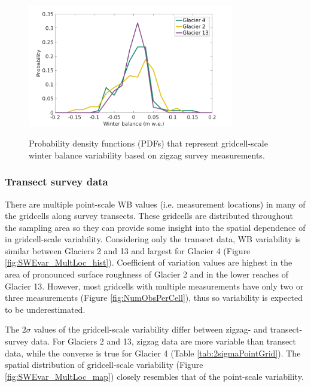\documentclass{sfuthesis}
\begin{document}
\begin{figure}[H]
	\centering
	\includegraphics[width =0.8\textwidth]{ZigzagPDF_G.png}\\
	\caption{Probability density functions (PDFs) that represent gridcell-scale winter balance variability based on zigzag survey measurements.}
	\label{fig:SWEvar_ZZG_hist}
\end{figure}

\subsubsection{Transect survey data}
There are multiple point-scale WB values (i.e. measurement locations) in many of the gridcells along survey transects. These gridcells are distributed throughout the sampling area so they can provide some insight into the spatial dependence of in gridcell-scale variability. Considering only the transect data, WB variability is similar between Glaciers 2 and 13 and largest for Glacier 4 (Figure \ref{fig:SWEvar_MultLoc_hist}). Coefficient of variation values are highest in the area of pronounced surface roughness of Glacier 2 and in the lower reaches of Glacier 13.  However, most gridcells with multiple measurements have only two or three measurements (Figure \ref{fig:NumObsPerCell}), thus so variability is expected to be underestimated. 


The $2\sigma$ values of the gridcell-scale variability differ between zigzag- and transect-survey data. For Glaciers 2 and 13, zigzag data are more variable than transect data, while the converse is true for Glacier 4 (Table  \ref{tab:2sigmaPointGrid}). The spatial distribution of gridcell-scale variability (Figure \ref{fig:SWEvar_MultLoc_map}) closely resembles that of the point-scale variability. 
\end{document}
